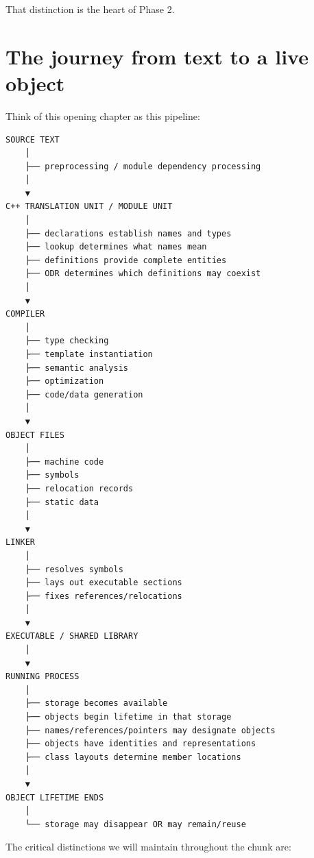 That distinction is the heart of Phase 2.

\section{The journey from text to a live object}\label{01-foundations-i-ch002-the-journey-from-text-to-a-live-object}

Think of this opening chapter as this pipeline:

\begin{verbatim}
SOURCE TEXT
    │
    ├── preprocessing / module dependency processing
    │
    ▼
C++ TRANSLATION UNIT / MODULE UNIT
    │
    ├── declarations establish names and types
    ├── lookup determines what names mean
    ├── definitions provide complete entities
    ├── ODR determines which definitions may coexist
    │
    ▼
COMPILER
    │
    ├── type checking
    ├── template instantiation
    ├── semantic analysis
    ├── optimization
    ├── code/data generation
    │
    ▼
OBJECT FILES
    │
    ├── machine code
    ├── symbols
    ├── relocation records
    ├── static data
    │
    ▼
LINKER
    │
    ├── resolves symbols
    ├── lays out executable sections
    ├── fixes references/relocations
    │
    ▼
EXECUTABLE / SHARED LIBRARY
    │
    ▼
RUNNING PROCESS
    │
    ├── storage becomes available
    ├── objects begin lifetime in that storage
    ├── names/references/pointers may designate objects
    ├── objects have identities and representations
    ├── class layouts determine member locations
    │
    ▼
OBJECT LIFETIME ENDS
    │
    └── storage may disappear OR may remain/reuse
\end{verbatim}

The critical distinctions we will maintain throughout the chunk are:

